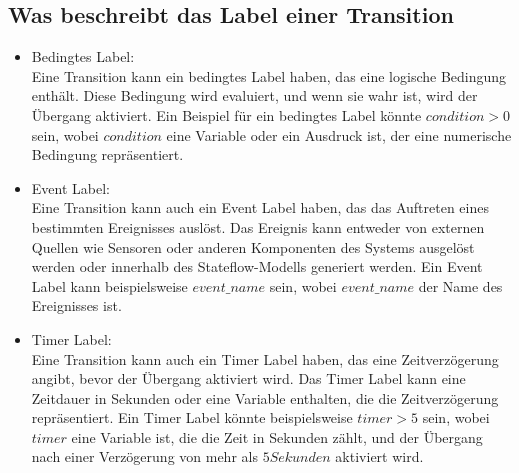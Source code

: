 \documentclass{article}
\begin{document}
\begin{multicols}{2}
		\subsection{Was beschreibt das Label einer Transition}
			\begin{itemize}
				\item Bedingtes Label: \\Eine Transition kann ein bedingtes Label haben, das eine logische Bedingung enthält. Diese Bedingung wird evaluiert, und wenn sie wahr ist, wird der Übergang aktiviert. Ein Beispiel für ein bedingtes Label könnte $condition > 0$ sein, wobei $condition$ eine Variable oder ein Ausdruck ist, der eine numerische Bedingung repräsentiert.
				\item Event Label: \\Eine Transition kann auch ein Event Label haben, das das Auftreten eines bestimmten Ereignisses auslöst. Das Ereignis kann entweder von externen Quellen wie Sensoren oder anderen Komponenten des Systems ausgelöst werden oder innerhalb des Stateflow-Modells generiert werden. Ein Event Label kann beispielsweise $event\_name$ sein, wobei $event\_name$ der Name des Ereignisses ist.
				\item Timer Label: \\Eine Transition kann auch ein Timer Label haben, das eine Zeitverzögerung angibt, bevor der Übergang aktiviert wird. Das Timer Label kann eine Zeitdauer in Sekunden oder eine Variable enthalten, die die Zeitverzögerung repräsentiert. Ein Timer Label könnte beispielsweise $timer > 5$ sein, wobei $timer$ eine Variable ist, die die Zeit in Sekunden zählt, und der Übergang nach einer Verzögerung von mehr als $5 Sekunden$ aktiviert wird.
			\end{itemize}

\end{multicols}
\end{document}
